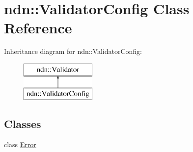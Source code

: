 \hypertarget{classndn_1_1ValidatorConfig}{}\section{ndn\+:\+:Validator\+Config Class Reference}
\label{classndn_1_1ValidatorConfig}
Inheritance diagram for ndn\+:\+:Validator\+Config\+:\begin{figure}[H]
\begin{center}
\leavevmode
\includegraphics[height=2.000000cm]{classndn_1_1ValidatorConfig}
\end{center}
\end{figure}
\subsection*{Classes}
\begin{DoxyCompactItemize}
\item 
class \hyperlink{classndn_1_1ValidatorConfig_1_1Error}{Error}
\end{DoxyCompactItemize}
